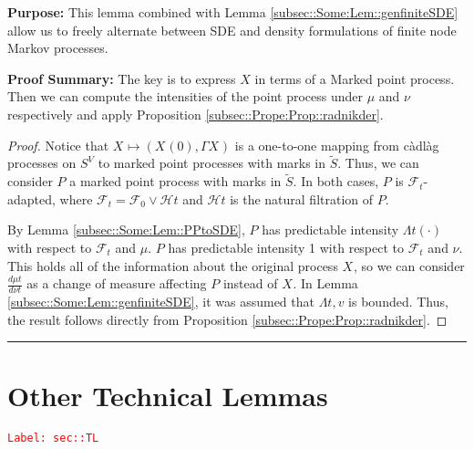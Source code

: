\documentclass[12pt]{article}
\newcommand{\mc}{\mathcal}
\newcommand{\tr}{\textcolor{red}}
\newcommand{\labe}[1]{\tr{\texttt{Label: #1}}}
\newcommand{\purpose}{\textbf{Purpose: }}
\newcommand{\pfsum}{\textbf{Proof Summary: }}
\newcommand{\ind}{\hspace{24pt}}
\newcommand{\lin}{\rule{\linewidth}{0.4 pt}}
\renewcommand{\v}{v}							%
\renewcommand{\S}{S}							%
\renewcommand{\t}{t}							%
\newcommand{\F}{\mc{F}}							%
\newcommand{\FH}{\mc{H}}						%
\newcommand{\X}{X}								%
\newcommand{\carp}[1]{^{#1}}					%
\newcommand{\vsi}[1]{^{#1}}						%
\newcommand{\cind}[1]{_{#1}}					%
\newcommand{\tp}[1]{(#1)}						%
\newcommand{\tip}[1]{#1}						%
\newcommand{\ts}[1]{_{#1}}						%
\newcommand{\alt}[1]{\widetilde{#1}}			%
\newcommand{\m}{\mu}							%
\newcommand{\mm}{\nu}							%
\newcommand{\pmap}{\Gamma}						%
\newcommand{\rp}{P}								%
\newcommand{\ratee}{\Lambda}					%
\begin{document}
\purpose This lemma combined with Lemma \ref{subsec::Some:Lem::genfiniteSDE} allow us to freely alternate between SDE and density formulations of finite node Markov processes.

\pfsum The key is to express \(\X\) in terms of a Marked point process. Then we can compute the intensities of the point process under \(\m\) and \(\mm\) respectively and apply Proposition \ref{subsec::Prope:Prop::radnikder}.

\begin{proof}
Notice that \(\X\cind{}\tip{} \mapsto (\X\cind{}\tp{0},\pmap{\X\cind{}\tip{}})\) is a one-to-one mapping from c\`adl\`ag processes on \(\S\carp{V}\) to marked point processes with marks in \(\alt{\S}\). Thus, we can consider \(\rp{}\) a marked point process with marks in \(\alt{\S}\). In both cases, \(\rp{}\) is \(\F\vsi{}\ts{\t}\)-adapted, where \(\F\vsi{}\ts{\t} = \F\vsi{}\ts{0}\vee \FH{}{\t}\) and \(\FH{}{\t}\) is the natural filtration of \(\rp{}\).

\ind By Lemma \ref{subsec::Some:Lem::PPtoSDE}, \(\rp{}\) has predictable intensity \(\ratee{\t}(\cdot)\) with respect to \(\F\vsi{}\ts{\t}\) and \(\m{}{}{}\). \(\rp{}\) has predictable intensity 1 with respect to \(\F\vsi{}\ts{\t}\) and \(\mm{}{}{}\). This holds all of the information about the original process \(\X\cind{}\tip{}\), so we can consider \(\frac{d\m{}{\t}{}}{d\mm{}{\t}{}}\) as a change of measure affecting \(\rp{}\) instead of \(\X\cind{}\tip{}\). In Lemma \ref{subsec::Some:Lem::genfiniteSDE}, it was assumed that \(\ratee{\t,\v}\) is bounded. Thus, the result follows directly from Proposition \ref{subsec::Prope:Prop::radnikder}. 
\end{proof}

\lin
\section{Other Technical Lemmas}
\label{sec::TL}\labe{sec::TL}
\end{document}
